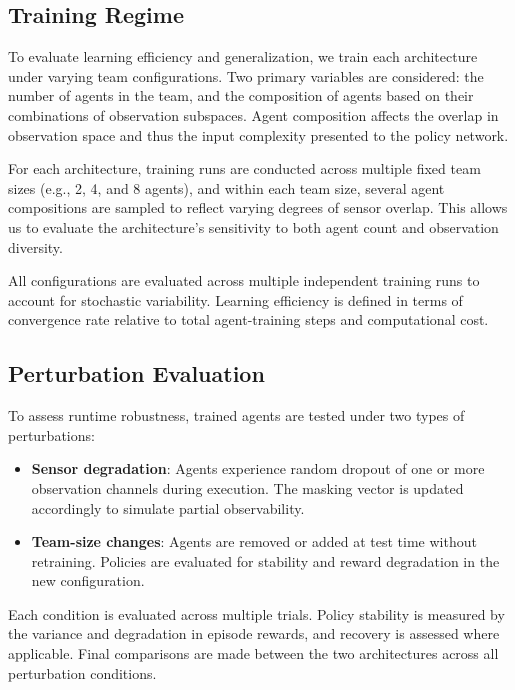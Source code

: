 
\subsection{Training Regime}

To evaluate learning efficiency and generalization, 
we train each architecture under varying team configurations. 
Two primary variables are considered: the number of agents in the team, 
and the composition of agents based on their combinations of observation subspaces. 
Agent composition affects the overlap in observation space and thus 
the input complexity presented to the policy network. 

For each architecture, training runs are conducted across multiple 
fixed team sizes (e.g., 2, 4, and 8 agents), and within each team size, 
several agent compositions are sampled to reflect varying degrees of sensor overlap. 
This allows us to evaluate the architecture's sensitivity to 
both agent count and observation diversity.

All configurations are evaluated across multiple independent 
training runs to account for stochastic variability.
Learning efficiency is defined in terms of convergence rate 
relative to total agent-training steps and computational cost.

\subsection{Perturbation Evaluation}

To assess runtime robustness, trained agents are tested under two types of perturbations:

\begin{itemize}
    \item \textbf{Sensor degradation}: Agents experience random dropout 
        of one or more observation channels during execution. 
        The masking vector is updated accordingly to simulate partial observability.
    \item \textbf{Team-size changes}: Agents are removed or added at test 
        time without retraining. Policies are evaluated for stability and 
        reward degradation in the new configuration.
\end{itemize}

Each condition is evaluated across multiple trials. 
Policy stability is measured by the variance and degradation in episode rewards, 
and recovery is assessed where applicable. 
Final comparisons are made between the two architectures across all perturbation conditions.


